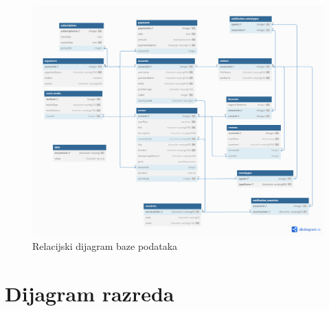 				\begin{figure}[htbp]
					\centering
					\includegraphics[width=1\textwidth]{dijagrami/relacijski_dijagram.png}
					\caption{Relacijski dijagram baze podataka}
					\label{fig:my_image}
				\end{figure}
				
				
	
			\eject
			
		\newpage	
		\section{Dijagram razreda}
		
			
